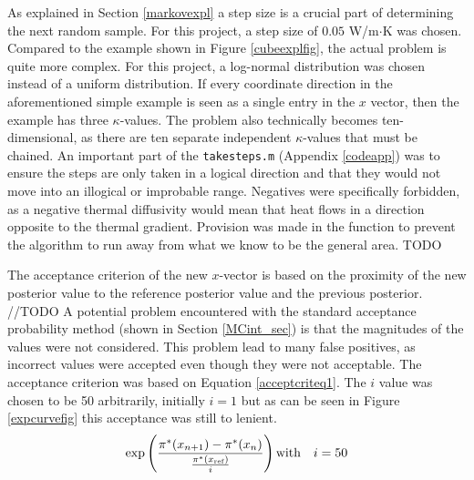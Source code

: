 As explained in Section \ref{markovexpl} a step size is a crucial part of determining the next random sample.
	For this project, a step size of $0.05$ W/m$\cdot$K was chosen.
	Compared to the example shown in Figure \ref{cubeexplfig}, the actual problem is quite more complex. 
	For this project, a log-normal distribution was chosen instead of a uniform distribution.
	If every coordinate direction in the aforementioned simple example is seen as a single entry in the $x$ vector, then the example has three $\kappa$-values.
	The problem also technically becomes ten-dimensional, as there are ten separate independent $\kappa$-values that must be chained.
	An important part of the \texttt{takesteps.m} (Appendix \ref{codeapp}) was to ensure the steps are only taken in a logical direction and that they would not move into an illogical or improbable range.
	Negatives were specifically forbidden, as a negative thermal diffusivity would mean that heat flows in a direction opposite to the thermal gradient.
	Provision was made in the function to prevent the algorithm to run away from what we know to be the general area. 
	TODO
%
%
%
%


%	
	
	The acceptance criterion of the new $x$-vector is based on the proximity of the new posterior value to the reference posterior value and the previous posterior. //TODO
	A potential problem encountered with the standard acceptance probability method (shown in Section \ref{MCint_sec}) is that the magnitudes of the values were not considered. 
	This problem lead to many false positives, as incorrect values were accepted even though they were not acceptable. 
	The acceptance criterion was based on Equation \ref{acceptcriteq1}.
	The $i$ value was chosen to be 50 arbitrarily, initially $i=1$ but as can be seen in Figure \ref{expcurvefig} this acceptance was still to lenient.
	\begin{equation}\label{acceptcriteq1}
	\exp\left(\frac {\pi^*(x_{n+1})-\pi^*(x_n)}{\frac{\pi^*(x_{\text{ref}})}{i}}\right)\\
	\text{with} \quad i = 50\\
	\end{equation}
	
